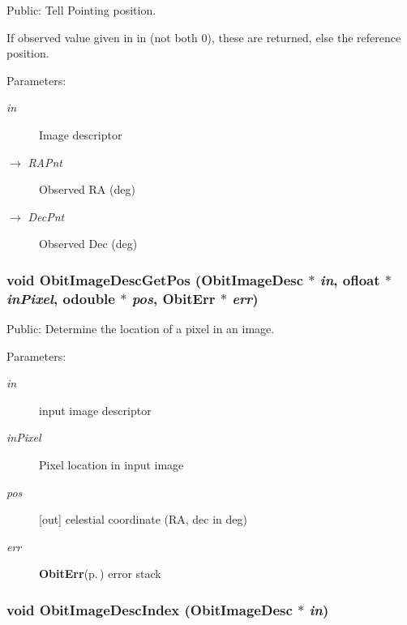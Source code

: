 Public: Tell Pointing position. 

If observed value given in in (not both 0), these are returned, else the reference position. \begin{Desc}
\item[Parameters:]
\begin{description}
\item[{\em in}]Image descriptor \item[\mbox{$\rightarrow$} {\em RAPnt}]Observed RA (deg) \item[\mbox{$\rightarrow$} {\em Dec\-Pnt}]Observed Dec (deg) \end{description}
\end{Desc}
\subsubsection{\setlength{\rightskip}{0pt plus 5cm}void Obit\-Image\-Desc\-Get\-Pos ({\bf Obit\-Image\-Desc} $\ast$ {\em in}, {\bf ofloat} $\ast$ {\em in\-Pixel}, {\bf odouble} $\ast$ {\em pos}, {\bf Obit\-Err} $\ast$ {\em err})}\label{ObitImageDesc_8h_a18}


Public: Determine the location of a pixel in an image. 

\begin{Desc}
\item[Parameters:]
\begin{description}
\item[{\em in}]input image descriptor \item[{\em in\-Pixel}]Pixel location in input image \item[{\em pos}][out] celestial coordinate (RA, dec in deg) \item[{\em err}]{\bf Obit\-Err}{\rm (p.\,\pageref{structObitErr})} error stack \end{description}
\end{Desc}
\subsubsection{\setlength{\rightskip}{0pt plus 5cm}void Obit\-Image\-Desc\-Index ({\bf Obit\-Image\-Desc} $\ast$ {\em in})}\label{ObitImageDesc_8h_a15}


